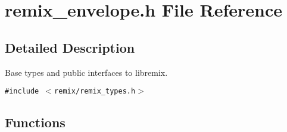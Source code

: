 \section{remix\_\-envelope.h File Reference}
\label{remix__envelope_8h}


\subsection{Detailed Description}
Base types and public interfaces to libremix. 



{\tt \#include $<$remix/remix\_\-types.h$>$}\par
\subsection*{Functions}

